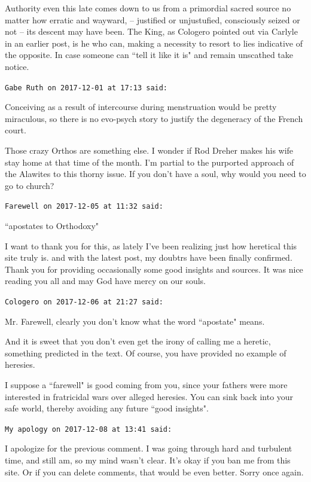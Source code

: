 \begin{footnotesize}
\begin{sffamily}
Authority even this late comes down to us from a primordial sacred source no matter how erratic and wayward, – justified or unjustufied, consciously seized or not – its descent may have been. The King, as Cologero pointed out via Carlyle in an earlier post, is he who can, making a necessity to resort to lies indicative of the opposite. In case someone can ``tell it like it is" and remain unscathed take notice.


\hfill

\texttt{Gabe Ruth on 2017-12-01 at 17:13 said: }

Conceiving as a result of intercourse during menstruation would be pretty miraculous, so there is no evo-psych story to justify the degeneracy of the French court. 

Those crazy Orthos are something else. I wonder if Rod Dreher makes his wife stay home at that time of the month. I'm partial to the purported approach of the Alawites to this thorny issue. If you don't have a soul, why would you need to go to church?


\hfill

\texttt{Farewell on 2017-12-05 at 11:32 said: }

``apostates to Orthodoxy"

I want to thank you for this, as lately I've been realizing just how heretical this site truly is. and with the latest post, my doubtrs have been finally confirmed. Thank you for providing occasionally some good insights and sources. It was nice reading you all and may God have mercy on our souls.


\hfill

\texttt{Cologero on 2017-12-06 at 21:27 said: }

Mr. Farewell, clearly you don't know what the word ``apostate" means.

And it is sweet that you don't even get the irony of calling me a heretic, something predicted in the text. Of course, you have provided no example of heresies.

I suppose a ``farewell" is good coming from you, since your fathers were more interested in fratricidal wars over alleged heresies. You can sink back into your safe world, thereby avoiding any future ``good insights".


\hfill

\texttt{My apology on 2017-12-08 at 13:41 said: }

I apologize for the previous comment. I was going through hard and turbulent time, and still am, so my mind wasn't clear. It's okay if you ban me from this site. Or if you can delete comments, that would be even better. Sorry once again.



\end{sffamily}
\end{footnotesize}

